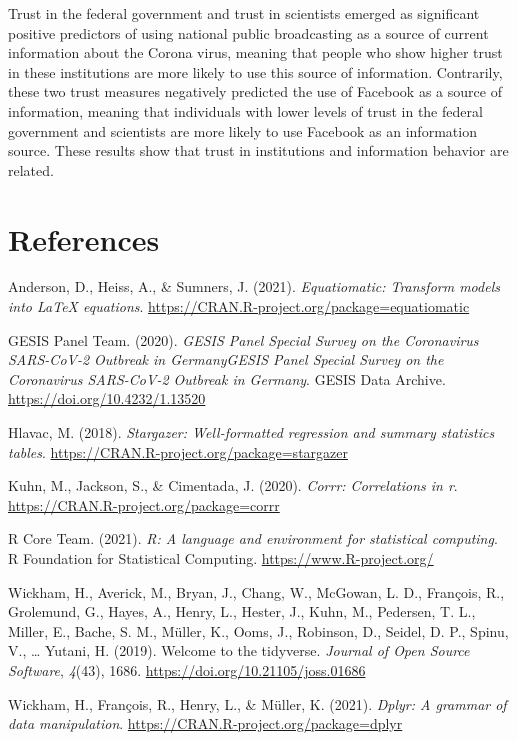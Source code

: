 \documentclass[
]{article}
\newlength{\cslhangindent}
\newlength{\cslentryspacingunit} %
\newenvironment{CSLReferences}[2] %
 {%
  \setlength{\parindent}{0pt}
  \ifodd #1
  \let\oldpar\par
  \def\par{\hangindent=\cslhangindent\oldpar}
  \fi
  \setlength{\parskip}{#2\cslentryspacingunit}
 }%
 {}
\begin{document}
Trust in the federal government and trust in scientists emerged as
significant positive predictors of using national public broadcasting as
a source of current information about the Corona virus, meaning that
people who show higher trust in these institutions are more likely to
use this source of information. Contrarily, these two trust measures
negatively predicted the use of Facebook as a source of information,
meaning that individuals with lower levels of trust in the federal
government and scientists are more likely to use Facebook as an
information source. These results show that trust in institutions and
information behavior are related.

\hypertarget{references}{%
\section{References}\label{references}}

\hypertarget{refs}{}
\begin{CSLReferences}{1}{0}
\leavevmode{}%
Anderson, D., Heiss, A., \& Sumners, J. (2021). \emph{Equatiomatic:
Transform models into LaTeX equations}.
\url{https://CRAN.R-project.org/package=equatiomatic}

\leavevmode{}%
GESIS Panel Team. (2020). \emph{{GESIS Panel Special Survey on the
Coronavirus SARS-CoV-2 Outbreak in GermanyGESIS Panel Special Survey on
the Coronavirus SARS-CoV-2 Outbreak in Germany}}. {GESIS Data Archive}.
\url{https://doi.org/10.4232/1.13520}

\leavevmode{}%
Hlavac, M. (2018). \emph{Stargazer: Well-formatted regression and
summary statistics tables}.
\url{https://CRAN.R-project.org/package=stargazer}

\leavevmode{}%
Kuhn, M., Jackson, S., \& Cimentada, J. (2020). \emph{Corrr:
Correlations in r}. \url{https://CRAN.R-project.org/package=corrr}

\leavevmode{}%
R Core Team. (2021). \emph{R: A language and environment for statistical
computing}. R Foundation for Statistical Computing.
\url{https://www.R-project.org/}

\leavevmode{}%
Wickham, H., Averick, M., Bryan, J., Chang, W., McGowan, L. D.,
François, R., Grolemund, G., Hayes, A., Henry, L., Hester, J., Kuhn, M.,
Pedersen, T. L., Miller, E., Bache, S. M., Müller, K., Ooms, J.,
Robinson, D., Seidel, D. P., Spinu, V., \ldots{} Yutani, H. (2019).
Welcome to the {tidyverse}. \emph{Journal of Open Source Software},
\emph{4}(43), 1686. \url{https://doi.org/10.21105/joss.01686}

\leavevmode{}%
Wickham, H., François, R., Henry, L., \& Müller, K. (2021). \emph{Dplyr:
A grammar of data manipulation}.
\url{https://CRAN.R-project.org/package=dplyr}

\end{CSLReferences}
\end{document}

